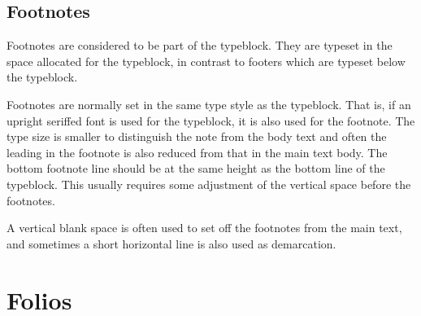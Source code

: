 \documentclass[10pt,a4paper,oneside,extrafontsizes]{memoir}%
\begin{document}

\subsection{Footnotes}

\begin{paracol}{2}
\switchEng
    Footnotes are considered to be part of the typeblock. 
They are typeset in the space allocated for the typeblock, 
in contrast to footers
which are typeset below the typeblock.

    Footnotes are normally set in the same type style as the 
typeblock. That is, if an upright seriffed font is used 
for the typeblock, it is
also used for the footnote. The
type size is smaller to distinguish the note from the body text and often
the leading in the footnote is also reduced from that in the main text body.
The bottom footnote line should be at the same height as the bottom line
of the typeblock. This usually requires some adjustment 
of the vertical space before the footnotes.

    A vertical blank space is often used to set off the footnotes from the
main text, and sometimes a short horizontal line is also used as demarcation.
\end{paracol}


\section{Folios}
\end{document}
